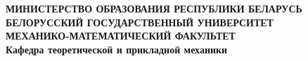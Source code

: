 \documentclass[a4paper]{article}
\begin{document}
	\begin{titlepage}
		\begin{center}
			\textbf{МИНИСТЕРСТВО ОБРАЗОВАНИЯ РЕСПУБЛИКИ БЕЛАРУСЬ\\
			БЕЛОРУССКИЙ ГОСУДАРСТВЕННЫЙ УНИВЕРСИТЕТ\\
			МЕХАНИКО-МАТЕМАТИЧЕСКИЙ ФАКУЛЬТЕТ\\
			Кафедра теоретической и прикладной механики}
		\end{center}
	\end{titlepage}
\end{document}
